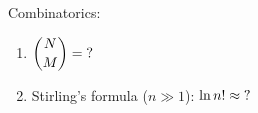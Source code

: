 

\vspace*{\fill}
\centering

Combinatorics:
\begin{enumerate}
    \item $\displaystyle \binom{N}{M} = {\rm ?}$ 
    \item Stirling's formula ($n \gg 1$): $\displaystyle \ln{n!} \approx {\rm ?}$
\end{enumerate}

\centering
\vspace*{\fill}

